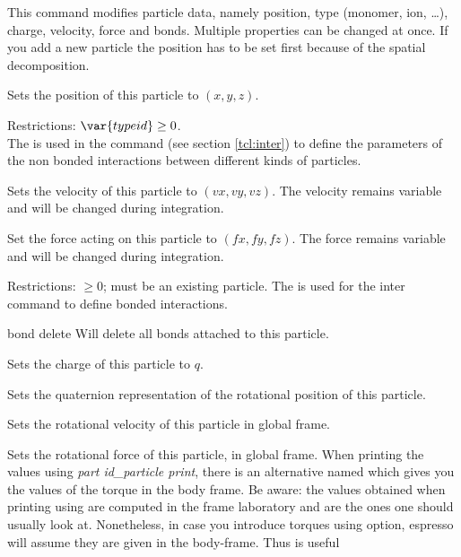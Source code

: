 This command modifies particle data, namely position, type (monomer,
ion, \dots), charge, velocity, force and bonds. Multiple properties can
be changed at once. If you add a new particle the position has to be
set first because of the spatial decomposition.

\begin{arguments}
\item[\var{pid}]
\item[\opt{pos \var{x} \var{y} \var{z}}] Sets the position of this
  particle to $(x,y,z)$.
\item[\opt{type \var{typeid}}] Restrictions:
  $\var{typeid} \geq 0$.\\ The
   is used in the  command
  (see section \vref{tcl:inter}) to define the parameters of the non
  bonded interactions between different kinds of particles.
\item[\opt{v \var{vx} \var{vy} \var{vz}}] Sets the velocity of
this particle to $(vx,vy,vz)$. The velocity remains variable and will be changed
during integration.
\item[\opt{f \var{fx} \var{fy} \var{fz}}] Set the force acting on this particle
to $(fx,fy,fz)$. The force remains variable and will be changed during integration.
\item[\opt{bond \var{bondid} \var{pid2}\dots}]
  Restrictions:  $\geq 0$;  must
  be an existing particle.  The  is used for
  the inter command to define bonded interactions.
\item[bond delete] Will delete all bonds attached to this particle.
\item[\opt{q \var{charge}}] Sets the charge of this particle to $q$.
\item[\opt{quat \var{q1} \var{q2} \var{q3} \var{q4}}] Sets the
  quaternion representation of the rotational position of this
  particle.
\item[\opt{omega \var{x} \var{y} \var{z}}] Sets the rotational velocity of this particle in global frame.
\item[\opt{torque \var{x} \var{y} \var{z}}] Sets the rotational force of this particle, in global frame.
  When printing the values using {\em part id_particle print}, there is an alternative named
   which gives you the values of the torque in the body frame.  Be aware: the values obtained when printing using 
  are computed in the frame laboratory and are the ones one should usually look at. Nonetheless,  in case you 
  introduce torques using  option, espresso will assume they are given in the body-frame. Thus  is useful

\end{arguments}
